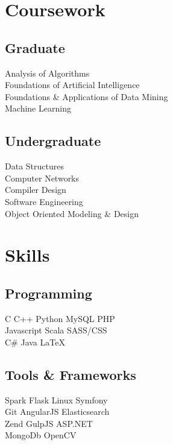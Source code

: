 \documentclass[]{deedy-resume}
\begin{document}
\begin{minipage}[t]{0.33\textwidth}

\section{Coursework}
\subsection{Graduate}
Analysis of Algorithms \\
Foundations of Artificial Intelligence \\
Foundations \& Applications of Data Mining \\
Machine Learning \\
\sectionsep

\subsection{Undergraduate}
Data Structures \\
Computer Networks \\
Compiler Design \\
Software Engineering \\
Object Oriented Modeling \& Design \\



\section{Skills}
\subsection{Programming}
C \textbullet{}   C++ \textbullet{} Python \textbullet{} MySQL \textbullet{} PHP \\ 
Javascript \textbullet{} Scala \textbullet{} SASS/CSS \\
C\# \textbullet{}  Java \textbullet{} \LaTeX\ \\ 
\sectionsep
\subsection{Tools \& Frameworks}
Spark \textbullet{} Flask \textbullet{} Linux \textbullet{} Symfony \\
Git \textbullet{} AngularJS \textbullet{} Elasticsearch \\
Zend \textbullet{} GulpJS \textbullet{} ASP.NET \\
MongoDb \textbullet{} OpenCV
\sectionsep
%
%

\end{minipage} 
\end{document}
